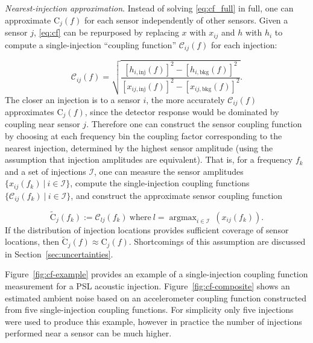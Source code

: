 \textit{Nearest-injection approximation}.
Instead of solving \cref{eq:cf_full} in full, one can approximate $\mathrm{C}_j(f)$ for each sensor independently of other sensors.
Given a sensor $j$, \cref{eq:cf} can be repurposed by replacing $x$ with $x_{ij}$ and $h$ with $h_i$ to compute a single-injection ``coupling function'' $\mathcal{C}_{ij}(f)$ for each injection:

\begin{equation}\label{eq:sicf}
	\mathcal{C}_{ij}(f) = \sqrt{\frac{[h_{i,\textrm{inj}}(f)]^2 - [h_{i,\textrm{bkg}}(f)]^2}{[x_{ij,\textrm{inj}}(f)]^2 - [x_{ij,\textrm{bkg}}(f)]^2}}.
\end{equation}
The closer an injection is to a sensor $i$, the more accurately $\mathcal{C}_{ij}(f)$ approximates $\mathrm{C}_j(f)$, since the detector response would be dominated by coupling near sensor $j$.
Therefore one can construct the sensor coupling function by choosing at each frequency bin the coupling factor corresponding to the nearest injection, determined by the highest sensor amplitude (using the assumption that injection amplitudes are equivalent).
That is, for a frequency $f_k$ and a set of injections $\mathcal{I}$, one can measure the sensor amplitudes $\{x_{ij}(f_k)\ |\ i \in \mathcal{I}\}$, compute the single-injection coupling functions $\{\mathcal{C}_{ij}(f_k)\ |\ i \in \mathcal{I}\}$, and construct the approximate sensor coupling function

\begin{equation}\label{eq:ccf}
	\widetilde{\mathrm{C}}_j(f_k) := \mathcal{C}_{lj}(f_k)\ \mathrm{where}\ l = \mathop{argmax}_{i\in\mathcal{I}}\ (x_{ij}(f_k)).
\end{equation}
If the distribution of injection locations provides sufficient coverage of sensor locations, then $\widetilde{\mathrm{C}}_j(f) \approx \mathrm{C}_j(f)$.
Shortcomings of this assumption are discussed in Section~\ref{sec:uncertainties}.

Figure~\ref{fig:cf-example} provides an example of a single-injection coupling function measurement for a \ac{PSL} acoustic injection.
Figure~\ref{fig:cf-composite} shows an estimated ambient noise based on an accelerometer coupling function constructed from five single-injection coupling functions.
For simplicity only five injections were used to produce this example, however in practice the number of injections performed near a sensor can be much higher.

